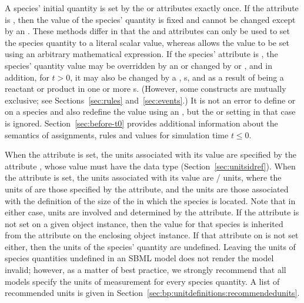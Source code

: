 A species' initial quantity is set by the  or
 attributes exactly once.
If the  attribute is ,
then the value of the species' quantity
is fixed and cannot be changed except
by an \InitialAssignment.  These methods differ in that the
 and 
attributes can only be used to set the species quantity
to a literal scalar value, whereas \InitialAssignment allows the
value to be set using an arbitrary mathematical expression.  If
the species'  attribute is ,
the species' quantity value may be overridden by an
\InitialAssignment or changed by \AssignmentRule or
\AlgebraicRule, and in addition, for $t > 0$, it may also be
changed by a \RateRule, \Event{}s, and as a result of being a
reactant or product in one or more \Reaction{}s. 
(However, some constructs are
mutually exclusive; see Sections~\ref{sec:rules}
and~\ref{sec:events}.)  It is not an error to define
 or  on a species
and also redefine the value using an \InitialAssignment, but the
 or  setting in
that case is ignored.  Section~\ref{sec:before-t0} provides
additional information about the semantics of assignments, rules
and values for simulation time $t \leq 0$.

When the  attribute is set, the units
associated with its value are specified by the \Species attribute
, whose value must have the data type
 (Section~\ref{sec:unitsidref}).  When the
 attribute is set, the units
associated with its value are /
units, where the units of  are those specified
by the  attribute, and the 
units are those associated with the definition of the size of the
\Compartment in which the species is located.  Note that in either
case,  units are involved and determined by
the  attribute.  If the
 attribute is not set on a given \Species
object instance, then the value for that species is inherited from
the  attribute on the enclosing \Model
object instance.  If that attribute on \Model is not set either,
then the units of the species' quantity are undefined.  Leaving
the units of species quantities undefined in an SBML model does
not render the model invalid; however, as a matter of best
practice, we strongly recommend that all models specify the units
of measurement for every species quantity.  A list of recommended
units is given in
Section~\ref{sec:bp:unitdefinitions:recommendedunits}.

